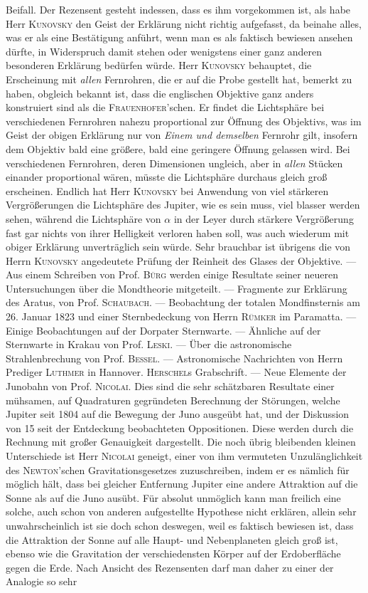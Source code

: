 Beifall. Der Rezensent gesteht indessen, dass es ihm vorgekommen ist, als habe Herr \textsc{Kunovsky} den Geist der Erklärung nicht richtig aufgefasst, da beinahe alles, was er als eine Bestätigung anführt, wenn man es als faktisch bewiesen ansehen dürfte, in Widerspruch damit stehen oder wenigstens einer ganz anderen besonderen Erklärung bedürfen würde. Herr \textsc{Kunovsky} behauptet, die Erscheinung mit \emph{allen} Fernrohren, die er auf die Probe gestellt hat, bemerkt zu haben, obgleich bekannt ist, dass die englischen Objektive ganz anders konstruiert sind als die \textsc{Frauenhofer}'schen. Er findet die Lichtsphäre bei verschiedenen Fernrohren nahezu proportional zur Öffnung des Objektivs, was im Geist der obigen Erklärung nur von \emph{Einem und demselben} Fernrohr gilt, insofern dem Objektiv bald eine größere, bald eine geringere Öffnung gelassen wird. Bei verschiedenen Fernrohren, deren Dimensionen ungleich, aber in \emph{allen} Stücken einander proportional wären, müsste die Lichtsphäre durchaus gleich groß erscheinen. Endlich hat Herr \textsc{Kunovsky} bei Anwendung von viel stärkeren Vergrößerungen die Lichtsphäre des Jupiter, wie es sein muss, viel blasser werden sehen, während die Lichtsphäre von $\alpha$ in der Leyer durch stärkere Vergrößerung fast gar nichts von ihrer Helligkeit verloren haben soll, was auch wiederum mit obiger Erklärung unverträglich sein würde. Sehr brauchbar ist übrigens die von Herrn \textsc{Kunovsky} angedeutete Prüfung der Reinheit des Glases der Objektive. --- Aus einem Schreiben von Prof. \textsc{Bürg} werden einige Resultate seiner neueren Untersuchungen über die Mondtheorie mitgeteilt. --- Fragmente zur Erklärung des Aratus, von Prof. \textsc{Schaubach}. --- Beobachtung der totalen Mondfinsternis am 26. Januar 1823 und einer Sternbedeckung von Herrn \textsc{Rümker} im Paramatta. --- Einige Beobachtungen auf der Dorpater Sternwarte. --- Ähnliche auf der Sternwarte in Krakau von Prof. \textsc{Leski}. --- Über die astronomische Strahlenbrechung von Prof. \textsc{Bessel}. --- Astronomische Nachrichten von Herrn Prediger \textsc{Luthmer} in Hannover. \textsc{Herschel}s Grabschrift. --- Neue Elemente der Junobahn von Prof. \textsc{Nicolai}. Dies sind die sehr schätzbaren Resultate einer mühsamen, auf Quadraturen gegründeten Berechnung der Störungen, welche Jupiter seit 1804 auf die Bewegung der Juno ausgeübt hat, und der Diskussion von 15 seit der Entdeckung beobachteten Oppositionen. Diese werden durch die Rechnung mit großer Genauigkeit dargestellt. Die noch übrig bleibenden kleinen Unterschiede ist Herr \textsc{Nicolai} geneigt, einer von ihm vermuteten Unzulänglichkeit des \textsc{Newton}'schen Gravitationsgesetzes zuzuschreiben, indem er es nämlich für möglich hält, dass bei gleicher Entfernung Jupiter eine andere Attraktion auf die Sonne als auf die Juno ausübt. Für absolut unmöglich kann man freilich eine solche, auch schon von anderen aufgestellte Hypothese nicht erklären, allein sehr unwahrscheinlich ist sie doch schon deswegen, weil es faktisch bewiesen ist, dass die Attraktion der Sonne auf alle Haupt- und Nebenplaneten  gleich groß ist, ebenso wie die Gravitation der verschiedensten Körper auf der Erdoberfläche gegen die Erde. Nach Ansicht des Rezensenten darf man daher zu einer der Analogie so sehr 